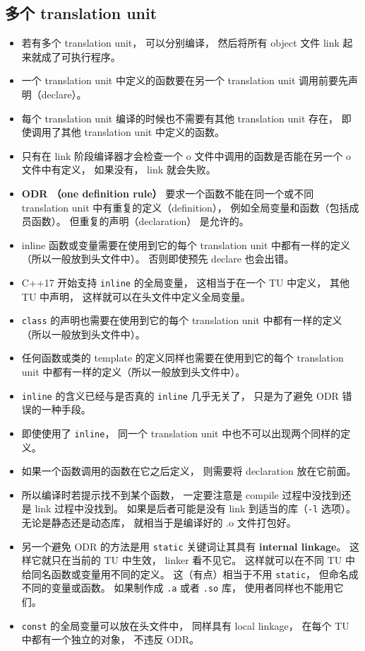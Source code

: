 \subsection{多个  translation unit}
\begin{itemize}
\item 若有多个 translation unit， 可以分别编译， 然后将所有 object 文件 link 起来就成了可执行程序。
\item 一个 translation unit 中定义的函数要在另一个 translation unit 调用前要先声明（declare）。
\item 每个 translation unit 编译的时候也不需要有其他 translation unit 存在， 即使调用了其他 translation unit 中定义的函数。
\item 只有在 link 阶段编译器才会检查一个 o 文件中调用的函数是否能在另一个 o 文件中有定义， 如果没有， link 就会失败。
\item \textbf{ODR （one definition rule）} 要求一个函数不能在同一个或不同 translation unit 中有重复的定义（definition）， 例如全局变量和函数（包括成员函数）。 但重复的声明（declaration） 是允许的。
\item inline 函数或变量需要在使用到它的每个 translation unit 中都有一样的定义（所以一般放到头文件中）。 否则即使预先 declare 也会出错。
\item C++17 开始支持 \verb|inline| 的全局变量， 这相当于在一个 TU 中定义， 其他 TU 中声明， 这样就可以在头文件中定义全局变量。
\item \verb|class| 的声明也需要在使用到它的每个 translation unit 中都有一样的定义（所以一般放到头文件中）。
\item 任何函数或类的 template 的定义同样也需要在使用到它的每个 translation unit 中都有一样的定义（所以一般放到头文件中）。
\item \verb|inline| 的含义已经与是否真的 \verb|inline| 几乎无关了， 只是为了避免 ODR 错误的一种手段。
\item 即使使用了 \verb|inline|， 同一个 translation unit 中也不可以出现两个同样的定义。
\item 如果一个函数调用的函数在它之后定义， 则需要将 declaration 放在它前面。
\item 所以编译时若提示找不到某个函数， 一定要注意是 compile 过程中没找到还是 link 过程中没找到。 如果是后者可能是没有 link 到适当的库（\verb|-l| 选项）。 无论是静态还是动态库， 就相当于是编译好的 .o 文件打包好。
\item 另一个避免 ODR 的方法是用 \verb|static| 关键词让其具有 \textbf{internal linkage}。 这样它就只在当前的 TU 中生效， linker 看不见它。 这样就可以在不同 TU 中给同名函数或变量用不同的定义。 这（有点）相当于不用 \verb|static|， 但命名成不同的变量或函数。 如果制作成 \verb|.a| 或者 \verb|.so| 库， 使用者同样也不能用它们。
\item \verb|const| 的全局变量可以放在头文件中， 同样具有 local linkage， 在每个 TU 中都有一个独立的对象， 不违反 ODR。
\end{itemize}
